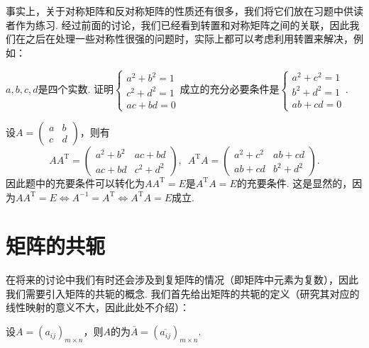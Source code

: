 事实上，关于对称矩阵和反对称矩阵的性质还有很多，我们将它们放在习题中供读者作为练习. 经过前面的讨论，我们已经看到转置和对称矩阵之间的关联，因此我们在之后在处理一些对称性很强的问题时，实际上都可以考虑利用转置来解决，例如：
\begin{example}{}{}
    $a,b,c,d$是四个实数. 证明$\begin{cases}
            a^2+b^2=1 \\
            c^2+d^2=1 \\
            ac+bd=0
        \end{cases}$成立的充分必要条件是$\begin{cases}
            a^2+c^2=1 \\
            b^2+d^2=1 \\
            ab+cd=0
        \end{cases}$.
\end{example}

\begin{solution}
    设$A=\begin{pmatrix}
            a & b \\ c & d
        \end{pmatrix}$，则有
    \[AA^\mathrm{T}=\begin{pmatrix}
            a^2+b^2 & ac+bd \\ ac+bd & c^2+d^2
        \end{pmatrix},\enspace A^\mathrm{T}A=\begin{pmatrix}
            a^2+c^2 & ab+cd \\ ab+cd & b^2+d^2
        \end{pmatrix}.\]
    因此题中的充要条件可以转化为$AA^\mathrm{T}=E$是$A^\mathrm{T}A=E$的充要条件. 这是显然的，因为$AA^\mathrm{T}=E\iff A^{-1}=A^\mathrm{T}\iff A^\mathrm{T}A=E$成立.
\end{solution}

\section{矩阵的共轭}

在将来的讨论中我们有时还会涉及到复矩阵的情况（即矩阵中元素为复数），因此我们需要引入矩阵的共轭的概念. 我们首先给出矩阵的共轭的定义（研究其对应的线性映射的意义不大，因此此处不介绍）：
\begin{definition}{}{}
    设$A=(a_{ij})_{m \times n}$，则$A$的为$\overline{A}=(\overline{a_{ij}})_{m \times n}$.
\end{definition}

